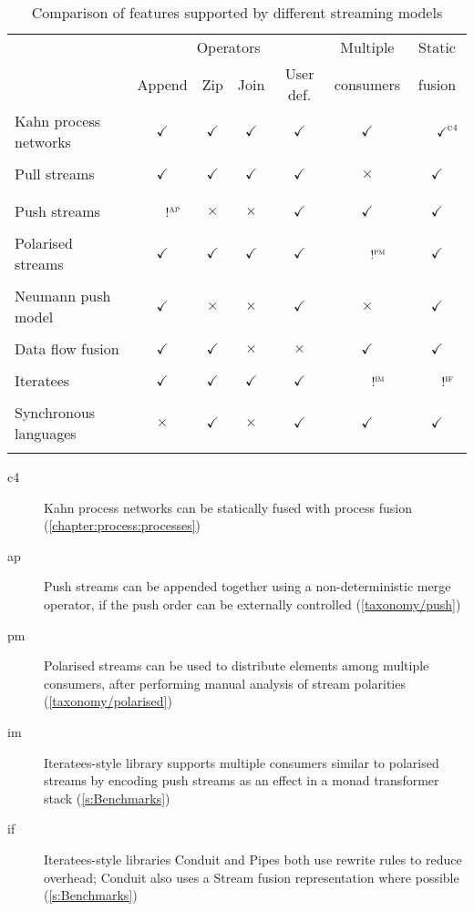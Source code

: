 \newcommand\Y{$\checkmark$}
\newcommand\N{$\times$}
\begin{table}
\begin{tabular}{l|cccccc}
 & \multicolumn{4}{c}{Operators} & Multiple & Static \\
 & Append & Zip & Join & User def. & consumers & fusion \\
\hline
Kahn process networks   & \Y & \Y & \Y & \Y & \Y & ~~~$\checkmark^{\textsc{c4}}$  \\
\\
Pull streams            & \Y & \Y & \Y & \Y & \N & \Y \\
\quad \citet{coutts2007stream} \\
\quad \citet{kiselyov2016stream} \\
Push streams            & ~~~$!^{\textsc{ap}}$ & \N & \N & \Y & \Y & \Y \\
\\
Polarised streams       & \Y & \Y & \Y & \Y & ~~~$!^{\textsc{pm}}$ & \Y \\
\quad \citet{bernardy2015duality} \\
Neumann push model      & \Y & \N & \N & \Y & \N & \Y \\
\quad \citet{biboudis2017expressive} \\
Data flow fusion        & \Y & \Y & \N & \N & \Y & \Y \\
\quad \citet{lippmeier2013data} \\
Iteratees        & \Y & \Y & \Y & \Y & ~~~$!^{\textsc{im}}$ & ~~~$!^{\textsc{if}}$ \\
\quad \citet{kiselyov2012iteratees} \\
Synchronous languages & \N & \Y & \N & \Y & \Y & \Y \\
\quad \citet{mandel2010lucy} \\
\end{tabular}

\begin{description}
\item[c4]Kahn process networks can be statically fused with process fusion (\cref{chapter:process:processes})
\item[ap]Push streams can be appended together using a non-deterministic merge operator, if the push order can be externally controlled (\cref{taxonomy/push})
\item[pm]Polarised streams can be used to distribute elements among multiple consumers, after performing manual analysis of stream polarities (\cref{taxonomy/polarised})
\item[im]Iteratees-style library \Streaming \citep{hackage:streaming} supports multiple consumers similar to polarised streams by encoding push streams as an effect in a monad transformer stack (\cref{s:Benchmarks})
\item[if]Iteratees-style libraries Conduit \citep{hackage:conduit} and Pipes \citep{hackage:pipes} both use rewrite rules to reduce overhead; Conduit also uses a Stream fusion representation where possible (\cref{s:Benchmarks})
\end{description}
\caption{Comparison of features supported by different streaming models}
\label{03-body/02-process/07-related/table}
\end{table}

